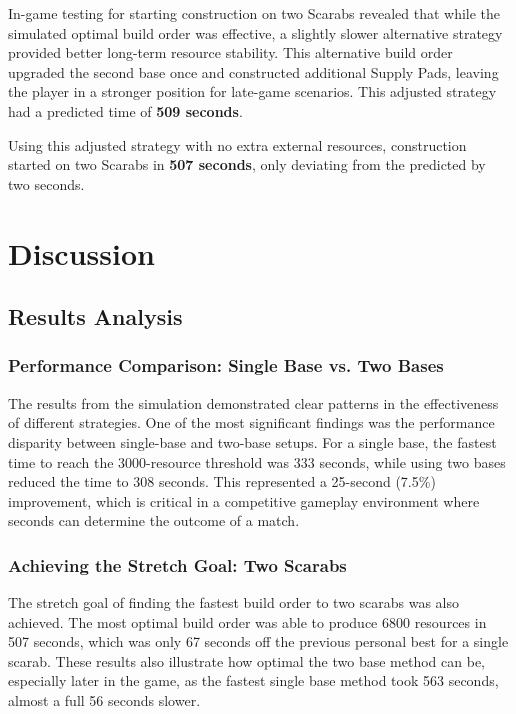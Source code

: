 \documentclass[a4paper, 12pt, english]{article}
\begin{document}
In-game testing for starting construction on two Scarabs revealed that while the simulated optimal build order was effective, a slightly slower alternative strategy provided better long-term resource stability. This alternative build order upgraded the second base once and constructed additional Supply Pads, leaving the player in a stronger position for late-game scenarios. This adjusted strategy had a predicted time of \textbf{509 seconds}.
\newline

Using this adjusted strategy with no extra external resources, construction started on two Scarabs in \textbf{507 seconds}, only deviating from the predicted by two seconds.
\newline



\newpage
\section{Discussion}
\subsection{Results Analysis}
\subsubsection{Performance Comparison: Single Base vs. Two Bases}
The results from the simulation demonstrated clear patterns in the effectiveness of different strategies. One of the most significant findings was the performance disparity between single-base and two-base setups. For a single base, the fastest time to reach the 3000-resource threshold was 333 seconds, while using two bases reduced the time to 308 seconds. This represented a 25-second (7.5\%) improvement, which is critical in a competitive gameplay environment where seconds can determine the outcome of a match.
\newline

\subsubsection{Achieving the Stretch Goal: Two Scarabs}
The stretch goal of finding the fastest build order to two scarabs was also achieved. The most optimal build order was able to produce 6800 resources in 507 seconds, which was only 67 seconds off the previous personal best for a single scarab. These results also illustrate how optimal the two base method can be, especially later in the game, as the fastest single base method took 563 seconds, almost a full 56 seconds slower. 
\newline
\end{document}
